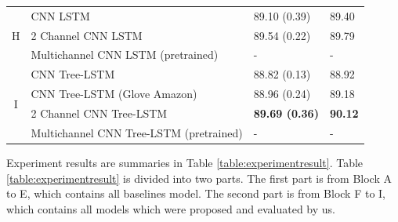 \begin{table}[H]
\begin{tabular}{c|lll}
\hline
\hline
        \multirow{3}{*}{H} & CNN LSTM                                 & 89.10 (0.39)  & 89.40 \Tstrut  \\
        & 2 Channel CNN LSTM                        & 89.54    (0.22) & 89.79    \\
        & Multichannel CNN LSTM (pretrained) & - & - \\
\hline
        \multirow{4}{*}{I} & CNN Tree-LSTM                            & 88.82 (0.13) & 88.92 \\
        & CNN Tree-LSTM (Glove Amazon)             & 88.96 (0.24) & 89.18 \\
        & 2 Channel CNN Tree-LSTM  &\textbf{89.69 (0.36)} & \textbf{90.12}    \\
        & Multichannel CNN Tree-LSTM (pretrained)        & - & -        \\
    \end{tabular}
\end{table}



Experiment results are summaries in Table \ref{table:experimentresult}.
Table \ref{table:experimentresult} is divided into two parts.
The first part is from Block A to E, which contains all baselines model.
The second part is from Block F to I, which contains all models which were proposed and evaluated by us.

